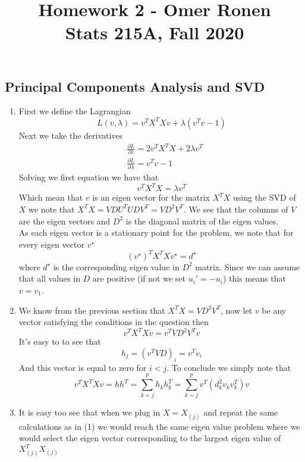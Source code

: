 \documentclass[a4paper]{article}
\begin{document}
\title{Homework 2 - Omer Ronen\\Stats 215A, Fall 2020
  }
\date{}
\maketitle
\vspace{-5em}

\begin{description}
\section{Principal Components Analysis and SVD}
\item[•]
\begin{enumerate}
\item{}
First we define the Lagrangian
\[
L(v,\lambda) = v^{T}X^{T}Xv + \lambda (v^{T} v -1 )
\]
Next we take the derivatives
\[
\begin{aligned}
& \frac{\partial L}{\partial v} = 2 v^{T}X^{T}X + 2\lambda v^{T}\\
& \frac{\partial L}{\partial \lambda} = v^{T} v -1 
\end{aligned}
\]
Solving we first equation we have that
\[
v^{T}X^{T}X = \lambda v^{T}
\]
Which mean that $v$ is an eigen vector for the matrix $X^T X$ using the SVD of $X$ we note that $X^T X = VDU^{T} UDV^{T} = VD^{2}V^{T}$. We see that the columns of $V$ are the eigen vectors and $D^2$ is the diagonal matrix of the eigen values.\\
As each eigen vector is a stationary point for the problem, we note that for every eigen vector $v^{\star}$
\[
(v^{\star})^T X^T X v^{\star} = d^{\star}
\]
where $d^{\star}$ is the corresponding eigen value in $D^{2}$ matrix. Since we can assume that all values in $D$ are positive (if not we set $u_i' = - u_i$) this means that $v = v_1$.\\
\item{}
We know from the previous section that $X^T X =  VD^{2}V^{T}$, now let $v$ be any vector satisfying the conditions in the question then
\[
v^T X^T X v = v^T VD^{2}V^{T} v
\]
It's easy to to see that
\[
    h_j = (v^T VD)_i =v^T v_i
\]
And this vector is equal to zero for $i<j$. To conclude we simply note that 
\[
v^T X^T X v = h h^T  = \sum_{k=j}^{p} h_k h_k^T = \sum_{k=j}^{p} v^T (d_k^{2} v_k v_k^T) v
\]
\item{}
It is easy too see that when we plug in $X=X_{(j)}$ and repeat the same calculations as in (1) we would reach the same eigen value problem where we would select the eigen vector corresponding to the largest eigen value of $X_{(j)}^T X_{(j)}$\\

\end{enumerate}
\end{description}
\end{document}

